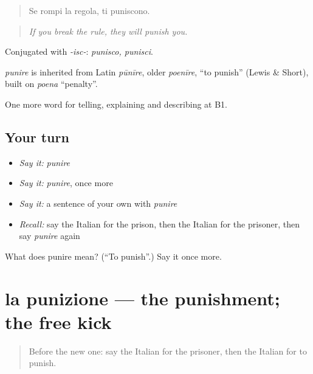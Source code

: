 \begin{quote}
Se rompi la regola, ti puniscono.
\end{quote}

\begin{quote}
\emph{If you break the rule, they will punish you.}
\end{quote}

Conjugated with \emph{-isc-}: \emph{punisco, punisci}.

\begin{cousinweb}
\emph{punire} is inherited from Latin \emph{pūnīre}, older \emph{poenīre}, \textquotedblleft{}to punish\textquotedblright{} (Lewis \& Short), built on \emph{poena} \textquotedblleft{}penalty\textquotedblright{}.
\end{cousinweb}

\begin{grammarlens}[title={What you've built}]
One more word for telling, explaining and describing at B1.
\end{grammarlens}

\subsection*{Your turn}
\begin{itemize}
\raggedright
  \item \emph{Say it:} \emph{punire}
  \item \emph{Say it:} \emph{punire}, once more
  \item \emph{Say it:} a sentence of your own with \emph{punire}
  \item \emph{Recall:} say the Italian for the prison, then the Italian for the prisoner, then say \emph{punire} again
\end{itemize}

\begin{tcolorbox}[breakable,colback=teal!4,colframe=teal!35!black,title={Before you move on}]
What does punire mean? (\textquotedblleft{}To punish\textquotedblright{}.) Say it once more.
\end{tcolorbox}
\section[la punizione]{la punizione — the punishment; the free kick}

\label{lesson:IT-C393-punizione}



\begin{quote}
Before the new one: say the Italian for the prisoner, then the Italian for to punish.
\end{quote}


